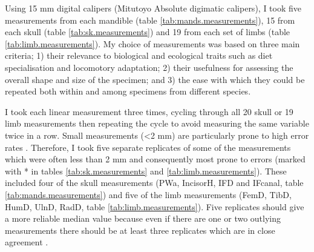 	Using 15 mm digital calipers (Mitutoyo Absolute digimatic calipers), I took five measurements from each mandible (table \ref{tab:mands.measurements}), 15 from each skull (table \ref{tab:sk.measurements}) and 19 from each set of limbs (table \ref{tab:limb.measurements}). My choice of  measurements was based on three main criteria; 1) their relevance to biological and ecological traits such as diet specialisation and locomotory adaptation; 2) their usefulness for assessing the overall shape and size of the specimen; and 3) the ease with which they could be repeated both within and among specimens from different species. 


	I took each linear measurement three times, cycling through all 20 skull or 19 limb measurements then repeating the cycle to avoid measuring the same variable twice in a row. Small measurements (<2 mm) are particularly prone to high error rates \citep{Cardini2008}. Therefore, I took five separate replicates of some of the measurements which were often less than 2 mm and consequently most prone to errors (marked with * in tables \ref{tab:sk.measurements} and \ref{tab:limb.measurements}). These included four of the skull measurements (PWa, IncisorH, IFD and IFcanal, table \ref{tab:mands.measurements}) and five of the limb measurements (FemD, TibD, HumD, UlnD, RadD, table \ref{tab:limb.measurements}). 
	Five replicates should give a more reliable median value because even if there are one or two outlying measurements there should be at least three replicates which are in close agreement \citep{Cooper2009}.
	



